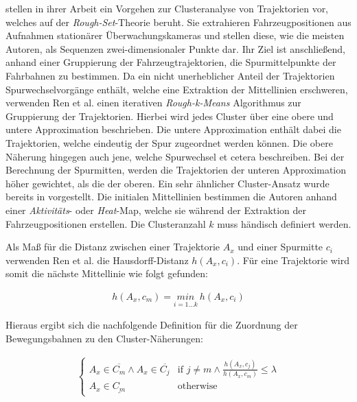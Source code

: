 \cite[]{Ren2014} stellen in ihrer Arbeit ein Vorgehen zur Clusteranalyse von Trajektorien vor,
welches auf der \textit{Rough-Set}-Theorie beruht. Sie extrahieren Fahrzeugpositionen aus Aufnahmen stationärer
Überwachungskameras und stellen diese, wie die meisten Autoren, als Sequenzen zwei-dimensionaler
Punkte dar. Ihr Ziel ist anschließend, anhand einer Gruppierung der Fahrzeugtrajektorien,
die Spurmittelpunkte der Fahrbahnen zu bestimmen. Da ein nicht unerheblicher Anteil der Trajektorien Spurwechselvorgänge
enthält, welche eine Extraktion der Mittellinien erschweren, verwenden Ren et al. einen iterativen \textit{Rough-k-Means}
Algorithmus zur Gruppierung der Trajektorien. Hierbei wird jedes Cluster über eine obere und untere Approximation beschrieben.
Die untere Approximation enthält dabei die Trajektorien, welche eindeutig der Spur zugeordnet werden können.
Die obere Näherung hingegen auch jene, welche Spurwechsel et cetera beschreiben. Bei der Berechnung der Spurmitten, werden
die Trajektorien der unteren Approximation höher gewichtet, als die der oberen. Ein sehr ähnlicher Cluster-Ansatz wurde
bereits in \cite[]{Lingras2004} vorgestellt.
Die initialen Mittellinien bestimmen die Autoren anhand einer \textit{Aktivitäts}- oder \textit{Heat}-Map,
welche sie während der Extraktion der Fahrzeugpositionen erstellen. Die Clusteranzahl $k$ muss händisch definiert werden.

Als Maß für die Distanz zwischen einer Trajektorie $A_x$ und einer Spurmitte $c_i$ verwenden Ren et al. die
Hausdorff-Distanz $h(A_x, c_i)$. Für eine Trajektorie wird somit die nächste Mittellinie wie folgt gefunden:

\begin{ceqn}
\begin{align}
    h(A_x, c_m) = \underset{i = 1 ... k}{min}\ h(A_x, c_i)
\end{align}
\end{ceqn}

Hieraus ergibt sich die nachfolgende Definition für die Zuordnung der Bewegungsbahnen zu den Cluster-Näherungen:

\begin{ceqn}
\begin{align}
    \begin{cases}
        A_x \in \overline{C_m} \land A_x \in \overline{C_j} & \text{if } j \neq m \land \frac{h(A_x, c_j)}{h(A_x, c_m)} \leq \lambda \\
        A_x \in \underline{C_m} & \text{otherwise}
    \end{cases}
\end{align}
\end{ceqn}

